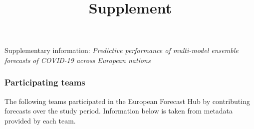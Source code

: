 \documentclass[
]{article}
\title{Supplement}
\author{}
\date{\vspace{-2.5em}}
\begin{document}
\maketitle

Supplementary information: \emph{Predictive performance of multi-model
ensemble forecasts of COVID-19 across European nations}

\hypertarget{participating-teams}{%
\subsubsection{Participating teams}\label{participating-teams}}

The following teams participated in the European Forecast Hub by
contributing forecasts over the study period. Information below is taken
from metadata provided by each team.
\end{document}
